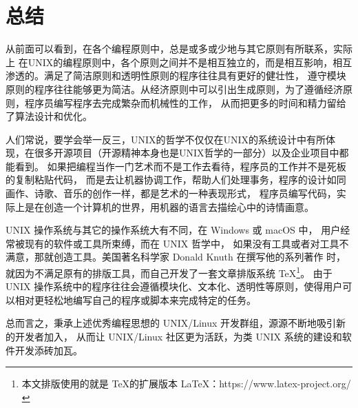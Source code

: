 \documentclass[UTF8]{ctexart}
\begin{document}
    \section{总结}
        从前面可以看到，在各个编程原则中，总是或多或少地与其它原则有所联系，实际上
        在UNIX的编程原则中，各个原则之间并不是相互独立的，而是相互影响，相互渗透的。满足了简洁原则和透明性原则的程序往往具有更好的健壮性，
        遵守模块原则的程序往往能够更为简洁。从经济原则中可以引出生成原则，为了遵循经济原则，程序员编写程序去完成繁杂而机械性的工作，
        从而把更多的时间和精力留给了算法设计和优化。

        人们常说，要学会举一反三，UNIX的哲学不仅仅在UNIX的系统设计中有所体现，在很多开源项目（开源精神本身也是UNIX哲学的一部分）以及企业项目中都能看到。
        如果把编程当作一门艺术而不是工作去看待，程序员的工作并不是死板的复制粘贴代码，
        而是去让机器协调工作，帮助人们处理事务，程序的设计如同画作、诗歌、音乐的创作一样，都是艺术的一种表现形式，
        程序员编写代码，实际上是在创造一个计算机的世界，用机器的语言去描绘心中的诗情画意。

        UNIX 操作系统与其它的操作系统大有不同，在 Windows 或 macOS 中，
        用户经常被现有的软件或工具所束缚，而在 UNIX 哲学中，
        如果没有工具或者对工具不满意，那就创造工具。美国著名科学家 Donald Knuth 在撰写他的系列著作 \cite{knuth1997art} 时，
        就因为不满足原有的排版工具，而自己开发了一套文章排版系统 \TeX \footnote{本文排版使用的就是 \TeX 的扩展版本 \LaTeX：https://www.latex-project.org/}。
        由于 UNIX 操作系统中的程序往往会遵循模块化、文本化、透明性等原则，使得用户可以相对更轻松地编写自己的程序或脚本来完成特定的任务。

        总而言之，秉承上述优秀编程思想的 UNIX/Linux 开发群组，源源不断地吸引新的开发者加入，
        从而让 UNIX/Linux 社区更为活跃，为类 UNIX 系统的建设和软件开发添砖加瓦。
    \newpage
    \nocite{KISS}
    \nocite{afzal2007unix}
    
\end{document}

